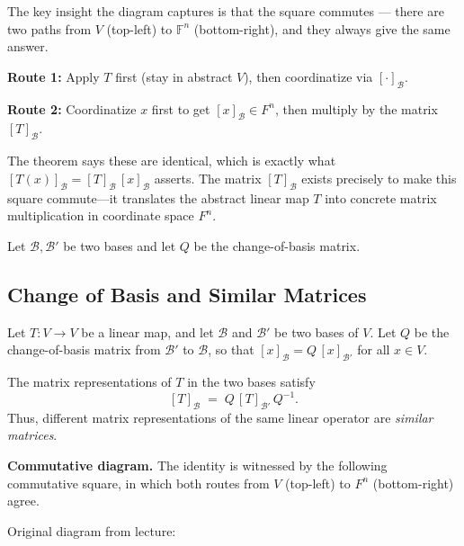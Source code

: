 \documentclass[12pt]{article}
\theoremstyle{remark}
\theoremstyle{definition}
\begin{document}
The key insight the diagram captures is that the square commutes — there are two paths from $V$ (top-left) to $\mathbb{F}^n$ (bottom-right), and they always give the same answer. 

\textbf{Route 1:} Apply $T$ first (stay in abstract $V$), then coordinatize via $[\cdot]_{\mathcal{B}}$.

\textbf{Route 2:} Coordinatize $x$ first to get $[x]_{\mathcal{B}} \in F^n$, then multiply by the matrix $[T]_{\mathcal{B}}$.

The theorem says these are identical, which is exactly what $    [T(x)]_{\mathcal{B}} = [T]_{\mathcal{B}}\, [x]_{\mathcal{B}}$ asserts. The matrix $[T]_{\mathcal{B}}$ exists precisely to make this square commute---it translates the abstract linear map $T$ into concrete matrix multiplication in coordinate space $F^n$.

Let $\mathcal{B}, \mathcal{B}'$ be two bases and let $Q$ be the change-of-basis matrix.


\subsection*{Change of Basis and Similar Matrices}

Let $T : V \to V$ be a linear map, and let $\mathcal{B}$ and $\mathcal{B}'$ be two bases of $V$.
Let $Q$ be the change-of-basis matrix from $\mathcal{B}'$ to $\mathcal{B}$, so that
$[x]_{\mathcal{B}} = Q\,[x]_{\mathcal{B}'}$ for all $x \in V$.

\medskip
The matrix representations of $T$ in the two bases satisfy
\[
    [T]_{\mathcal{B}} \;=\; Q\,[T]_{\mathcal{B}'}\,Q^{-1}.
\]
Thus, different matrix representations of the same linear operator are \emph{similar matrices}.

\medskip
\noindent\textbf{Commutative diagram.}
The identity is witnessed by the following commutative square,
in which both routes from $V$ (top-left) to $F^n$ (bottom-right) agree.

Original diagram from lecture:\\

\begin{center}
\end{center}
\end{document}
